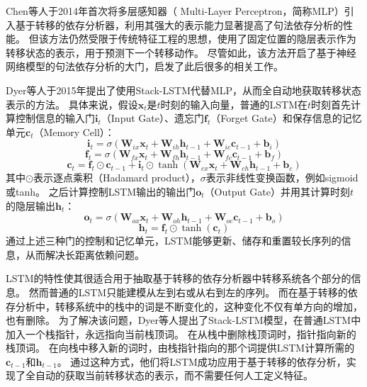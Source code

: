 Chen等人\cite{chen-manning-2014-fast}于2014年首次将多层感知器（
Multi-Layer Perceptron，简称MLP）引入基于转移的依存分析器，利用其强大的表示能力显著提高了句法依存分析的性能。
但该方法仍然受限于传统特征工程的思想，使用了固定位置的隐层表示作为转移状态的表示，用于预测下一个转移动作。
尽管如此，该方法开启了基于神经网络模型的句法依存分析的大门，启发了此后很多的相关工作。

Dyer等人\cite{dyer-etal-2015-transition}于2015年提出了使用Stack-LSTM代替MLP，从而全自动地获取转移状态表示的方法。
具体来说，假设$\bm{x}_t$是$t$时刻的输入向量，普通的LSTM在$t$时刻首先计算控制信息的输入门$\bm{i}_t$（Input Gate）、遗忘门$\bm{f}_t$（Forget Gate）和保存信息的记忆单元$\bm{c}_t$（Memory Cell）：
\begin{equation}
    \bm{i}_t = \sigma(\bm{W}_{ix}\bm{x}_t + \bm{W}_{ih}\bm{h}_{t-1} + \bm{W}_{ic}\bm{c}_{t-1} + \bm{b}_i)
\end{equation}
\begin{equation}
    \bm{f}_t = \sigma(\bm{W}_{fx}\bm{x}_t + \bm{W}_{fh}\bm{h}_{t-1} + \bm{W}_{fc}\bm{c}_{t-1} + \bm{b}_f)
\end{equation}
\begin{equation}
    \bm{c}_t = \bm{f}_{t}\odot\bm{c}_{t-1} + \bm{i}_{t}\odot \tanh(\bm{W}_{cx}\bm{x}_{t} + \bm{W}_{ch}\bm{h}_{t-1} + \bm{b}_c)
\end{equation}
其中$\odot$表示逐点乘积（Hadamard product），$\sigma$表示非线性变换函数，例如sigmoid或tanh。
之后计算控制LSTM输出的输出门$\bm{o}_t$（Output Gate）并用其计算时刻$t$的隐层输出$\bm{h}_t$：
\begin{equation}
    \bm{o}_t = \sigma(\bm{W}_{ox}\bm{x}_t + \bm{W}_{oh}\bm{h}_{t-1} + \bm{W}_{oc}\bm{c}_{t-1} + \bm{b}_o)
\end{equation}
\begin{equation}
    \bm{h}_t = \bm{f}_{t}\odot\tanh(\bm{c}_{t})
\end{equation}
通过上述三种门的控制和记忆单元，LSTM能够更新、储存和重置较长序列的信息，从而解决长距离依赖问题。

LSTM的特性使其很适合用于抽取基于转移的依存分析器中转移系统各个部分的信息。
然而普通的LSTM只能建模从左到右或从右到左的序列。
而在基于转移的依存分析中，转移系统中的栈中的词是不断变化的，这种变化不仅有单方向的增加，也有删除。
为了解决该问题，Dyer等人提出了Stack-LSTM模型，在普通LSTM中加入一个栈指针，永远指向当前栈顶词。
在从栈中删除栈顶词时，指针指向新的栈顶词。
在向栈中移入新的词时，由栈指针指向的那个词提供LSTM计算所需的$\bm{c}_{t-1}$和$\bm{h}_{t-1}$。
通过这种方式，他们将LSTM成功应用于基于转移的依存分析，实现了全自动的获取当前转移状态的表示，而不需要任何人工定义特征。

